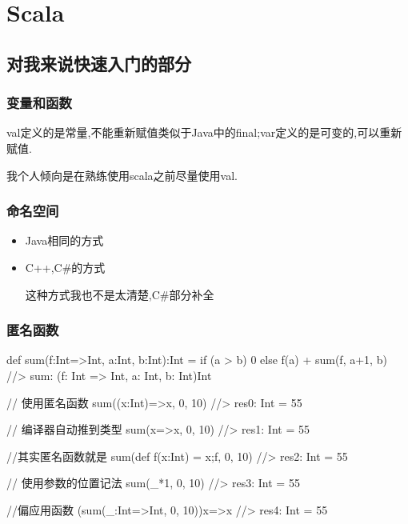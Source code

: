 \chapter{Scala}

\section{对我来说快速入门的部分}

\subsection{变量和函数}

val定义的是常量,不能重新赋值类似于Java中的final;var定义的是可变的,可以重新赋值.

我个人倾向是在熟练使用scala之前尽量使用val.

\subsection{命名空间}

\begin{itemize}
\item Java相同的方式
\item C++,C\#的方式

这种方式我也不是太清楚,C\#部分补全
\end{itemize}

\subsection{匿名函数}

\begin{Scala}
	def sum(f:Int=>Int, a:Int, b:Int):Int = {
		if (a > b)
			0
		else
			f(a) + sum(f, a+1, b)
	}                                         //> sum: (f: Int => Int, a: Int, b: Int)Int

	// 使用匿名函数
	sum((x:Int)=>x, 0, 10)                    //> res0: Int = 55

	// 编译器自动推到类型
	sum(x=>x, 0, 10)                          //> res1: Int = 55

	//其实匿名函数就是
	sum({def f(x:Int) = x;f}, 0, 10)          //> res2: Int = 55

	// 使用参数的位置记法
	sum({_*1}, 0, 10)                         //> res3: Int = 55

	//偏应用函数
	(sum(_:Int=>Int, 0, 10)){x=>x}            //> res4: Int = 55


\end{Scala}

